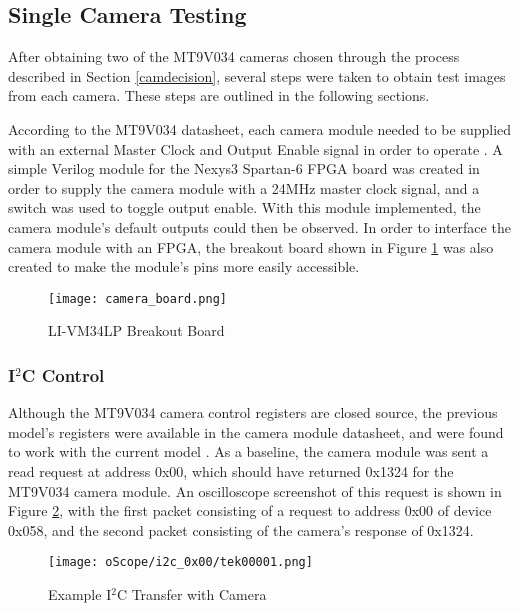 \subsection{Single Camera Testing}
After obtaining two of the MT9V034 cameras chosen through the process described in Section \ref{camdecision}, several steps were taken to obtain test images from each camera. These steps are outlined in the following sections.
\par
According to the MT9V034 datasheet, each camera module needed to be supplied with an external Master Clock and Output Enable signal in order to operate \cite{mt9v034}. A simple Verilog module for the Nexys3 Spartan-6 FPGA board was created in order to supply the camera module with a 24MHz master clock signal, and a switch was used to toggle output enable. With this module implemented, the camera module's default outputs could then be observed. In order to interface the camera module with an FPGA, the breakout board shown in Figure \ref{camBreakoutBoard} was also created to make the module's pins more easily accessible. 

\begin{figure}[H]
	\centerline{\texttt{[image: camera\_board.png]}}
	\caption{LI-VM34LP Breakout Board}
	\label{camBreakoutBoard}
\end{figure}

\subsubsection{I$^2$C Control} 
Although the MT9V034 camera control registers are closed source, the previous model's registers were available in the camera module datasheet, and were found to work with the current model  \cite{mt9v032}. As a baseline, the camera module was sent a read request at address 0x00, which should have returned 0x1324 for the MT9V034 camera module. An oscilloscope screenshot of this request is shown in Figure \ref{camVersion}, with the first packet consisting of a request to address 0x00 of device 0x058, and the second packet consisting of the camera's response of 0x1324. 
\begin{figure}[H]
	\centerline{\texttt{[image: oScope/i2c\_0x00/tek00001.png]}}
	\caption{Example I$^2$C Transfer with Camera}
	\label{camVersion}
\end{figure}

